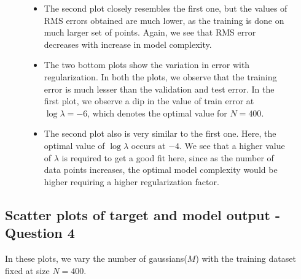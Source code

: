 \documentclass{article}
\begin{document}
\begin{figure}[H]
\begin{itemize}
\item The second plot closely resembles the first one, but the values of RMS errors obtained are much lower, as the training is done on much larger set of points. Again, we see that RMS error decreases with increase in model complexity.

\item The two bottom plots show the variation in error with regularization.
In both the plots, we observe that the training error is much lesser than the validation and test error. In the first plot, we observe a dip in the value of train error at $\log {\lambda} = -6 $, which denotes the optimal value for $N = 400$. 
\item The second plot also is very similar to the first one. Here, the optimal value of $\log{\lambda}$ occurs at $-4$. We see that a higher value of $\lambda$ is required to get a good fit here, since as the number of data points increases, the optimal model complexity would be higher requiring a higher regularization factor.
\end{itemize}


\end{figure}



\subsection{Scatter plots of target and model output - Question 4}

In these plots, we vary the number of gaussians($M$) with the training dataset fixed at size $N=400$. 
\end{document}

